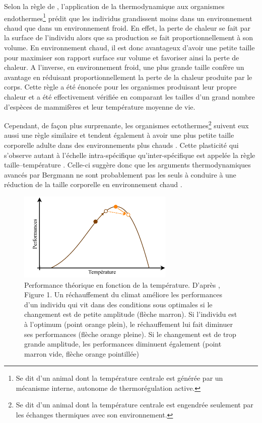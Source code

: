 Selon la règle de \textcites{bergmann1848a}, l'application de la thermodynamique
aux organismes endothermes\footnote{Se dit d'un animal dont la température
centrale est générée par un mécanisme interne, autonome de thermorégulation
active.} prédit que les individus grandissent moins dans un environnement chaud que dans un environnement froid. En effet, la perte de chaleur se fait par la surface de l'individu alors que sa production se fait
proportionnellement à son volume. En environnement chaud, il est donc avantageux
d'avoir une petite taille pour maximiser son rapport surface sur volume et
favoriser ainsi la perte de chaleur. A l'inverse, en environnement froid, une
plus grande taille confère un avantage en réduisant proportionnellement la perte
de la chaleur produite par le corps. Cette règle a été énoncée pour les organismes produisant
leur propre chaleur et a été effectivement vérifiée en comparant les tailles
d'un grand nombre d'espèces de mammifères et leur température moyenne de vie. 

Cependant, de façon plus surprenante, les organismes ectothermes\footnote{Se dit
d'un animal dont la température centrale est engendrée seulement par les échanges thermiques avec son environnement.} suivent eux aussi une règle similaire et tendent également à avoir une plus petite taille
corporelle adulte dans des environnements plus chauds
\autocites{angilletta2009a,ohlberger2013a}.
Cette plasticité qui s'observe autant à l'échelle intra-spécifique
qu'inter-spécifique est appelée la règle taille--température
\autocites[``\textbf{temperature--size rule}''][]{atkinson1994a}. Celle-ci
suggère donc que les arguments thermodynamiques avancés par Bergmann ne sont
probablement pas les seuls à conduire à une réduction de la taille corporelle en
environnement chaud \autocite{edeline2013a}.

\begin{figure}[!ht] %
\centering
\includegraphics[width=0.66\textwidth]{1_CorpsDeThese/EA/Fig/ThermalCurve.pdf}
\caption[
Performance théorique en fonction de la température]{Performance théorique en
fonction de la température. D'après \textcites{ohlberger2013a}, Figure 1. Un
réchauffement du climat améliore les performances d'un individu qui vit dans
des conditions sous optimales si le changement est de petite amplitude (flèche
marron). Si l'individu est à l'optimum (point orange plein), le réchauffement
lui fait diminuer ses performances (flèche orange pleine). Si le changement est
de trop grande amplitude, les performances diminuent également (point marron
vide, flèche orange pointillée)}
\label{Fig:EA1}
\end{figure}


